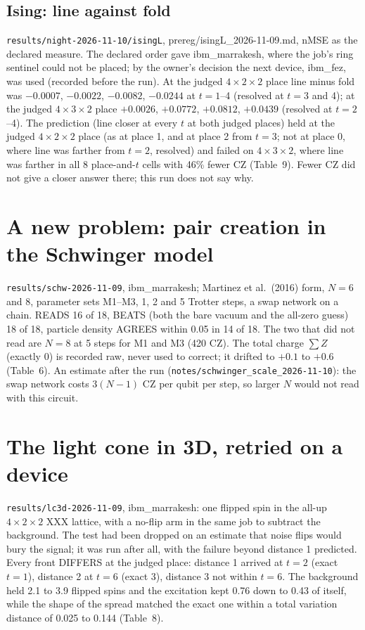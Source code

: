 \documentclass[10pt,a4paper]{article}
\begin{document}
\subsection{Ising: line against fold}
\texttt{results/night-2026-11-10/isingL}, prereg/isingL\_2026-11-09.md, nMSE as the declared measure. The declared
order gave ibm\_marrakesh, where the job's ring sentinel could not be placed; by the owner's decision the next device,
ibm\_fez, was used (recorded before the run). At the judged $4\times2\times2$ place line minus fold was $-0.0007$,
$-0.0022$, $-0.0082$, $-0.0244$ at $t = 1$--4 (resolved at $t = 3$ and 4); at the judged $4\times3\times2$ place
$+0.0026$, $+0.0772$, $+0.0812$, $+0.0439$ (resolved at $t = 2$--4). The prediction (line closer at every $t$ at both judged places) held at the judged
$4\times2\times2$ place (as at place 1, and at place 2 from $t = 3$; not at place 0, where line was farther from
$t = 2$, resolved) and failed on $4\times3\times2$, where line was farther in all 8 place-and-$t$ cells with 46\%
fewer CZ (Table~9). Fewer CZ did not give a closer answer there; this run does not say why.

\section{A new problem: pair creation in the Schwinger model}\label{sec:schwinger}
\texttt{results/schw-2026-11-09}, ibm\_marrakesh; Martinez et al.\ (2016) form, $N = 6$ and 8, parameter sets M1--M3,
1, 2 and 5 Trotter steps, a swap network on a chain. READS 16 of 18, BEATS (both the bare vacuum and the all-zero
guess) 18 of 18, particle density AGREES within 0.05 in 14 of 18. The two that did not read are $N = 8$ at 5 steps
for M1 and M3 (420 CZ). The total charge $\sum Z$ (exactly 0) is recorded raw, never used to correct; it drifted to
$+0.1$ to $+0.6$ (Table~6). An estimate after the run (\texttt{notes/schwinger\_scale\_2026-11-10}): the swap network
costs $3(N-1)$ CZ per qubit per step, so larger $N$ would not read with this circuit.

\section{The light cone in 3D, retried on a device}\label{sec:lc}
\texttt{results/lc3d-2026-11-09}, ibm\_marrakesh: one flipped spin in the all-up $4\times2\times2$ XXX lattice, with
a no-flip arm in the same job to subtract the background. The test had been dropped on an estimate that noise flips
would bury the signal; it was run after all, with the failure beyond distance 1 predicted. Every front DIFFERS at the
judged place: distance 1 arrived at $t = 2$ (exact $t = 1$), distance 2 at $t = 6$ (exact 3), distance 3 not within
$t = 6$. The background held 2.1 to 3.9 flipped spins and the excitation kept 0.76 down to 0.43 of itself, while the
shape of the spread matched the exact one within a total variation distance of 0.025 to 0.144 (Table~8).
\end{document}
